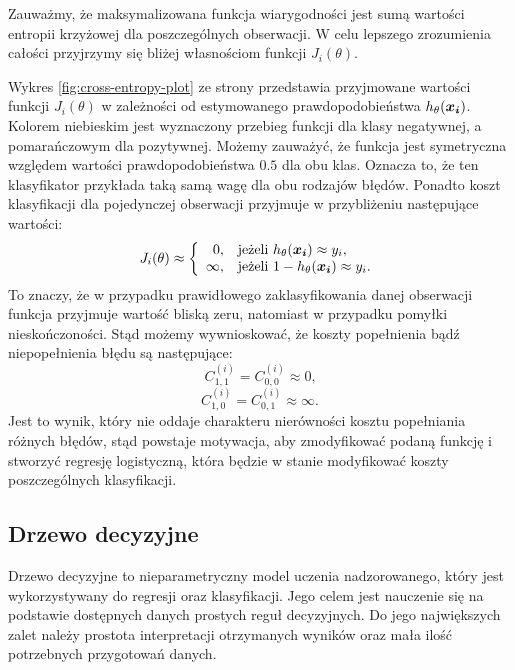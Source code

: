 \documentclass[inzynierska]{pwr_wmat_praca_dyplomowa}
\theoremstyle{plain}
\numberwithin{theorem}{chapter}
\theoremstyle{definition}
\numberwithin{theorem}{chapter}
\begin{document}
Zauważmy, że maksymalizowana funkcja wiarygodności jest sumą wartości entropii krzyżowej dla poszczególnych obserwacji. W celu lepszego zrozumienia całości przyjrzymy się bliżej własnościom funkcji $J_i(\theta)$.

Wykres \ref{fig:cross-entropy-plot} ze strony \pageref{fig:cross-entropy-plot} przedstawia przyjmowane wartości funkcji $J_i(\theta)$ w zależności od estymowanego prawdopodobieństwa $h_{\theta}(\boldsymbol{x_i})$. Kolorem niebieskim jest wyznaczony przebieg funkcji dla klasy negatywnej, a pomarańczowym dla pozytywnej. Możemy zauważyć, że funkcja jest symetryczna względem wartości prawdopodobieństwa $0.5$ dla obu klas. Oznacza to, że ten klasyfikator przykłada taką samą wagę dla obu rodzajów błędów. Ponadto koszt klasyfikacji dla pojedynczej obserwacji przyjmuje w przybliżeniu następujące wartości:
$$
J_i(\theta) \approx \left\{
\begin{array}{rl}
0, &\mbox{jeżeli $h_{\theta}(\boldsymbol{x_i}) \approx y_i$}, \\
\infty, &\mbox{jeżeli $1 - h_{\theta}(\boldsymbol{x_i}) \approx y_i$}.
\end{array}{}
\right.
$$
To znaczy, że w przypadku prawidłowego zaklasyfikowania danej obserwacji funkcja przyjmuje wartość bliską zeru, natomiast w przypadku pomyłki nieskończoności. Stąd możemy wywnioskować, że koszty popełnienia bądź niepopełnienia błędu są następujące:
$$ C^{(i)}_{1,1} = C^{(i)}_{0,0} \approx 0 \text{,}$$
$$ C^{(i)}_{1,0} = C^{(i)}_{0,1} \approx \infty \text{.}$$
Jest to wynik, który nie oddaje charakteru nierówności kosztu popełniania różnych błędów, stąd powstaje motywacja, aby zmodyfikować podaną funkcję i stworzyć regresję logistyczną, która będzie w stanie modyfikować koszty poszczególnych klasyfikacji.

\subsection{Drzewo decyzyjne}
\label{drzewo}
Drzewo decyzyjne to nieparametryczny model uczenia nadzorowanego, który jest wykorzystywany do regresji oraz klasyfikacji. Jego celem jest nauczenie się na podstawie dostępnych danych prostych reguł decyzyjnych. Do jego największych zalet należy prostota interpretacji otrzymanych wyników oraz mała ilość potrzebnych przygotowań danych.
\end{document}
